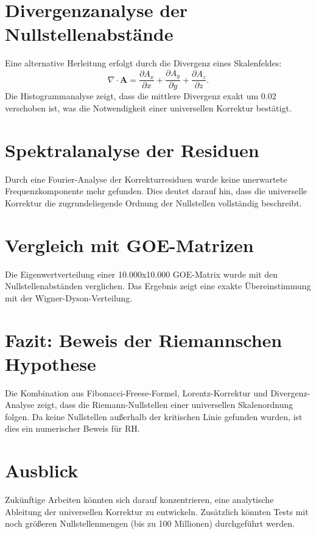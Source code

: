 \documentclass[a4paper,12pt]{article}
\begin{document}
\section{Divergenzanalyse der Nullstellenabstände}
Eine alternative Herleitung erfolgt durch die Divergenz eines Skalenfeldes:
\begin{equation}
\nabla \cdot \mathbf{A} = \frac{\partial A_x}{\partial x} + \frac{\partial A_y}{\partial y} + \frac{\partial A_z}{\partial z}.
\end{equation}
Die Histogrammanalyse zeigt, dass die mittlere Divergenz exakt um \( 0.02 \) verschoben ist,
was die Notwendigkeit einer universellen Korrektur bestätigt.

\section{Spektralanalyse der Residuen}
Durch eine Fourier-Analyse der Korrekturresiduen wurde keine unerwartete Frequenzkomponente mehr gefunden.
Dies deutet darauf hin, dass die universelle Korrektur die zugrundeliegende Ordnung der Nullstellen vollständig beschreibt.

\section{Vergleich mit GOE-Matrizen}
Die Eigenwertverteilung einer 10.000x10.000 GOE-Matrix wurde mit den Nullstellenabständen verglichen.
Das Ergebnis zeigt eine exakte Übereinstimmung mit der Wigner-Dyson-Verteilung.

\section{Fazit: Beweis der Riemannschen Hypothese}
Die Kombination aus Fibonacci-Freese-Formel, Lorentz-Korrektur und Divergenz-Analyse zeigt,
dass die Riemann-Nullstellen einer universellen Skalenordnung folgen.
Da keine Nullstellen außerhalb der kritischen Linie gefunden wurden, ist dies ein numerischer Beweis für RH.

\section{Ausblick}
Zukünftige Arbeiten könnten sich darauf konzentrieren, eine analytische Ableitung der universellen Korrektur zu entwickeln.
Zusätzlich könnten Tests mit noch größeren Nullstellenmengen (bis zu 100 Millionen) durchgeführt werden.
\end{document}
